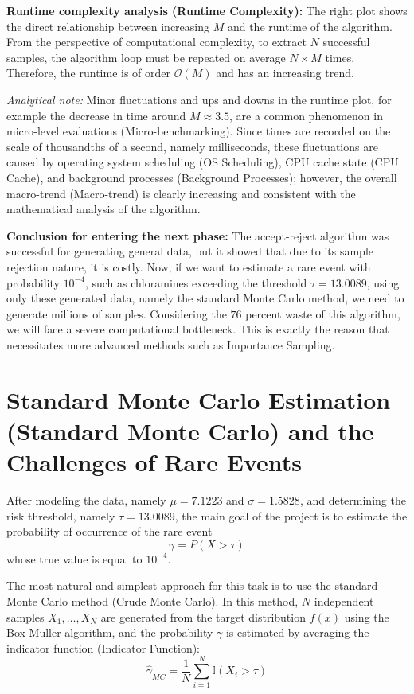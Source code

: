 \documentclass[12pt,a4paper]{article}
\begin{document}
	\textbf{Runtime complexity analysis (Runtime Complexity):}
	The right plot shows the direct relationship between increasing $M$ and the runtime of the algorithm. From the perspective of computational complexity, to extract $N$ successful samples, the algorithm loop must be repeated on average $N \times M$ times. Therefore, the runtime is of order $\mathcal{O}(M)$ and has an increasing trend.
	
	\textit{Analytical note:} Minor fluctuations and ups and downs in the runtime plot, for example the decrease in time around $M \approx 3.5$, are a common phenomenon in micro-level evaluations (Micro-benchmarking). Since times are recorded on the scale of thousandths of a second, namely milliseconds, these fluctuations are caused by operating system scheduling (OS Scheduling), CPU cache state (CPU Cache), and background processes (Background Processes); however, the overall macro-trend (Macro-trend) is clearly increasing and consistent with the mathematical analysis of the algorithm.
	
	\textbf{Conclusion for entering the next phase:}
	The accept-reject algorithm was successful for generating general data, but it showed that due to its sample rejection nature, it is costly. Now, if we want to estimate a rare event with probability $10^{-4}$, such as chloramines exceeding the threshold $\tau=13.0089$, using only these generated data, namely the standard Monte Carlo method, we need to generate millions of samples. Considering the $76$ percent waste of this algorithm, we will face a severe computational bottleneck. This is exactly the reason that necessitates more advanced methods such as Importance Sampling.
	
	\section{Standard Monte Carlo Estimation (Standard Monte Carlo) and the Challenges of Rare Events}
	
	After modeling the data, namely $\mu=7.1223$ and $\sigma=1.5828$, and determining the risk threshold, namely $\tau=13.0089$, the main goal of the project is to estimate the probability of occurrence of the rare event
	\[
	\gamma = P(X > \tau)
	\]
	whose true value is equal to $10^{-4}$.
	
	The most natural and simplest approach for this task is to use the standard Monte Carlo method (Crude Monte Carlo). In this method, $N$ independent samples $X_1,\dots,X_N$ are generated from the target distribution $f(x)$ using the Box-Muller algorithm, and the probability $\gamma$ is estimated by averaging the indicator function (Indicator Function):
	\[
	\hat{\gamma}_{MC} =
	\frac{1}{N}
	\sum_{i=1}^{N}
	\mathbb{I}(X_i > \tau)
	\]
	
\end{document}
